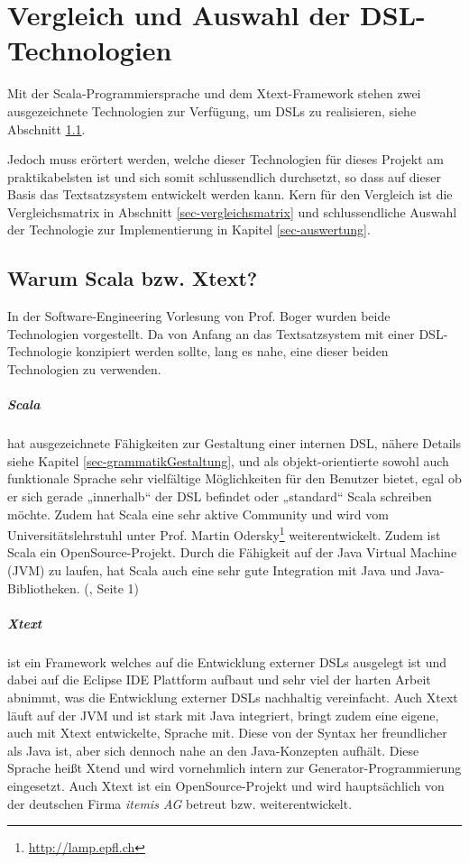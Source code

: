 \chapter{Vergleich und Auswahl der DSL-Technologien}\label{sec-vergleich}

Mit der Scala-Programmiersprache und dem Xtext-Framework stehen zwei
ausgezeichnete Technologien zur Verfügung, um DSLs zu realisieren, siehe
Abschnitt \ref{sec-warumAusgewaehlt}.

Jedoch muss erörtert werden, welche dieser Technologien für
dieses Projekt am praktikabelsten ist und sich somit schlussendlich durchsetzt,
so dass auf dieser Basis das Textsatzsystem entwickelt werden kann.
Kern für den Vergleich ist die Vergleichsmatrix in Abschnitt
\ref{sec-vergleichsmatrix} und schlussendliche Auswahl der Technologie zur
Implementierung in Kapitel \ref{sec-auswertung}.

\section{Warum Scala bzw. Xtext?}\label{sec-warumAusgewaehlt}

In der Software-Engineering Vorlesung von Prof. Boger wurden beide
Technologien vorgestellt. Da von Anfang an das Textsatzsystem mit einer
DSL-Technologie konzipiert werden sollte, lang es nahe, eine dieser
beiden Technologien zu verwenden.

\paragraph{Scala}
hat ausgezeichnete Fähigkeiten zur Gestaltung einer
internen DSL, nähere Details siehe Kapitel \ref{sec-grammatikGestaltung},
und als objekt-orientierte sowohl auch funktionale Sprache sehr
vielfältige Möglichkeiten für den Benutzer bietet, egal ob er sich
gerade „innerhalb“ der DSL befindet oder „standard“ Scala schreiben
möchte. Zudem hat Scala eine sehr aktive Community und wird vom
Universitätslehrstuhl unter Prof. Martin
Odersky\footnote{\url{http://lamp.epfl.ch}} weiterentwickelt.
Zudem ist Scala ein OpenSource-Projekt.
Durch die Fähigkeit auf der Java Virtual Machine (JVM) zu laufen,
hat Scala auch eine sehr gute Integration mit Java und
Java-Bibliotheken. (\cite{scala-ref}, Seite 1)

\paragraph{Xtext}
ist ein Framework welches auf die Entwicklung externer DSLs
ausgelegt ist und dabei auf die Eclipse IDE Plattform aufbaut
und sehr viel der harten Arbeit abnimmt, was die Entwicklung
externer DSLs nachhaltig vereinfacht.
Auch Xtext läuft auf der JVM und ist stark mit Java integriert, bringt
zudem eine eigene, auch mit Xtext entwickelte, Sprache mit. Diese von der
Syntax her freundlicher als Java ist, aber sich dennoch nahe an den
Java-Konzepten aufhält. Diese Sprache heißt Xtend und wird vornehmlich
intern zur Generator-Programmierung eingesetzt.
Auch Xtext ist ein OpenSource-Projekt und wird hauptsächlich von der
deutschen Firma \emph{itemis AG} betreut bzw. weiterentwickelt. \cite{xtext}

